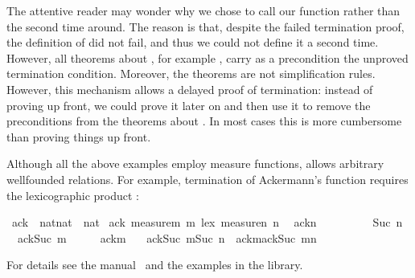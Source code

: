 \begin{isabellebody}
\begin{isamarkuptext}
The attentive reader may wonder why we chose to call our function 
rather than  the second time around. The reason is that, despite
the failed termination proof, the definition of  did not
fail, and thus we could not define it a second time. However, all theorems
about , for example , carry as a precondition
the unproved termination condition. Moreover, the theorems
 are not simplification rules. However, this mechanism
allows a delayed proof of termination: instead of proving
 up front, we could prove 
it later on and then use it to remove the preconditions from the theorems
about . In most cases this is more cumbersome than proving things
up front.

Although all the above examples employ measure functions, 
allows arbitrary wellfounded relations. For example, termination of
Ackermann's function requires the lexicographic product :%
\end{isamarkuptext}%
\ ack\ {\isacharcolon}{\isacharcolon}\ {\isachardoublequote}nat{\isasymtimes}nat\ {\isasymRightarrow}\ nat{\isachardoublequote}\isanewline
{}\ ack\ {\isachardoublequote}measure{\isacharparenleft}{\isasymlambda}m{\isachardot}\ m{\isacharparenright}\ {\isacharless}{\isacharasterisk}lex{\isacharasterisk}{\isachargreater}\ measure{\isacharparenleft}{\isasymlambda}n{\isachardot}\ n{\isacharparenright}{\isachardoublequote}\isanewline
\ \ {\isachardoublequote}ack{\isacharparenleft}n{\isacharparenright}\ \ \ \ \ \ \ \ \ {\isacharequal}\ Suc\ n{\isachardoublequote}\isanewline
\ \ {\isachardoublequote}ack{\isacharparenleft}Suc\ m{\isacharcomma}\ \ \ \ \ {\isacharequal}\ ack{\isacharparenleft}m{\isacharcomma}\ \isanewline
\ \ {\isachardoublequote}ack{\isacharparenleft}Suc\ m{\isacharcomma}Suc\ n{\isacharparenright}\ {\isacharequal}\ ack{\isacharparenleft}m{\isacharcomma}ack{\isacharparenleft}Suc\ m{\isacharcomma}n{\isacharparenright}{\isacharparenright}{\isachardoublequote}%
\begin{isamarkuptext}%
\noindent
For details see the manual~\cite{isabelle-HOL} and the examples in the
library.%
\end{isamarkuptext}%
\end{isabellebody}%
